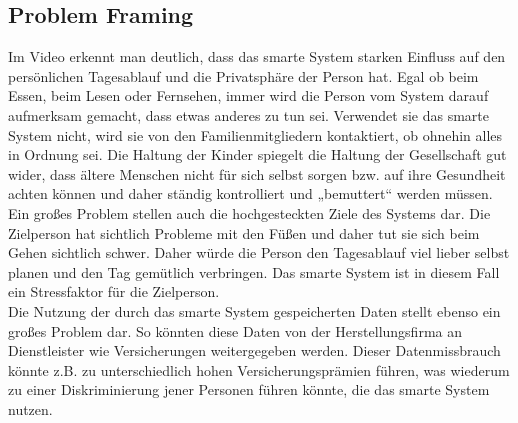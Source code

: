 \subsection{Problem Framing}
Im Video\cite{uninvatedGuests} erkennt man deutlich, dass das smarte System starken Einfluss auf den persönlichen Tagesablauf und die Privatsphäre der Person hat. Egal ob beim Essen, beim Lesen oder Fernsehen, immer wird die Person vom System darauf aufmerksam gemacht, dass etwas anderes zu tun sei. Verwendet sie das smarte System nicht, wird sie von den Familienmitgliedern kontaktiert, ob ohnehin alles in Ordnung sei. Die Haltung der Kinder spiegelt die Haltung der Gesellschaft gut wider, dass ältere Menschen nicht für sich selbst sorgen bzw. auf ihre Gesundheit achten können und daher ständig kontrolliert und „bemuttert“ werden müssen.  \\
Ein großes Problem stellen auch die hochgesteckten Ziele des Systems dar. Die Zielperson hat sichtlich Probleme mit den Füßen und daher tut sie sich beim Gehen sichtlich schwer. Daher würde die Person den Tagesablauf viel lieber selbst planen und den Tag gemütlich verbringen. Das smarte System ist in diesem Fall ein Stressfaktor für die Zielperson. \\
Die Nutzung der durch das smarte System gespeicherten Daten stellt ebenso ein großes Problem dar. So könnten diese Daten von der Herstellungsfirma an Dienstleister wie Versicherungen weitergegeben werden. Dieser Datenmissbrauch könnte z.B. zu unterschiedlich hohen Versicherungsprämien führen, was wiederum zu einer Diskriminierung jener Personen führen könnte, die das smarte System nutzen.  

